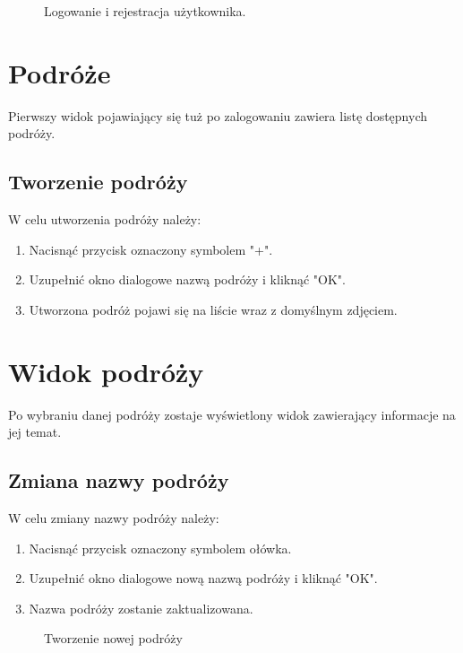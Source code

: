 \begin{figure}[h]

\centering
\null\hfill
{}
\hfill
{}
\hfill\null

\caption{Logowanie i rejestracja użytkownika.}
\label{fig:podrecznik1}
\end{figure}
\FloatBarrier

\section{Podróże}
Pierwszy widok pojawiający się tuż po zalogowaniu zawiera listę dostępnych podróży.

\subsection{Tworzenie podróży}
W celu utworzenia podróży należy:
\begin{enumerate}
\item Nacisnąć przycisk oznaczony symbolem "+".
\item Uzupełnić okno dialogowe nazwą podróży i kliknąć "OK".
\item Utworzona podróż pojawi się na liście wraz z domyślnym zdjęciem.
\end{enumerate}

\section{Widok podróży}
Po wybraniu danej podróży zostaje wyświetlony widok zawierający informacje na jej temat.

\subsection{Zmiana nazwy podróży}

W celu zmiany nazwy podróży należy:
\begin{enumerate}
\item Nacisnąć przycisk oznaczony symbolem ołówka.
\item Uzupełnić okno dialogowe nową nazwą podróży i kliknąć "OK".
\item Nazwa podróży zostanie zaktualizowana.
\end{enumerate}

\begin{figure}[h]
\centering
\null\hfill
{}
\hfill
{}
\hfill
{}
\hfill\null

\caption{Tworzenie nowej podróży}
\label{fig:podrecznik2}
\end{figure}
\FloatBarrier

